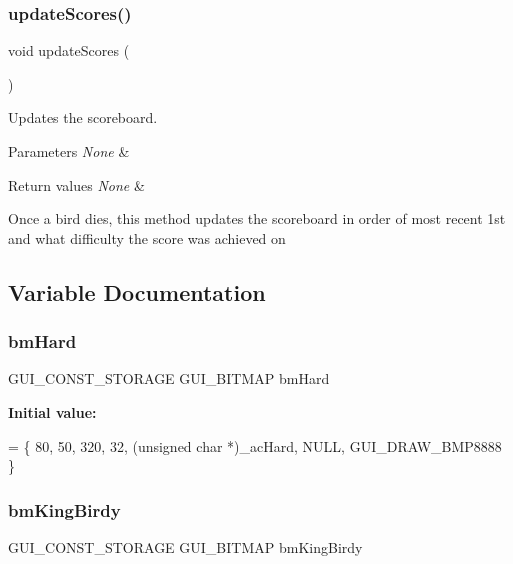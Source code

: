 \subsubsection{\texorpdfstring{update\+Scores()}{updateScores()}}
{\footnotesize\ttfamily void update\+Scores (\begin{DoxyParamCaption}{ }\end{DoxyParamCaption})}



Updates the scoreboard. 


\begin{DoxyParams}{Parameters}
{\em None} & \\
\hline
\end{DoxyParams}

\begin{DoxyRetVals}{Return values}
{\em None} & \\
\hline
\end{DoxyRetVals}
Once a bird dies, this method updates the scoreboard in order of most recent 1st and what difficulty the score was achieved on 

\subsection{Variable Documentation}
\mbox{\label{group___flappy___bird_ga7a953ee4b333e05b3030bb8122c960d2}} 
\subsubsection{\texorpdfstring{bm\+Hard}{bmHard}}
{\footnotesize\ttfamily G\+U\+I\+\_\+\+C\+O\+N\+S\+T\+\_\+\+S\+T\+O\+R\+A\+GE G\+U\+I\+\_\+\+B\+I\+T\+M\+AP bm\+Hard}

{\bfseries Initial value\+:}
\begin{DoxyCode}
= \{
  80, 
  50, 
  320, 
  32, 
  (\textcolor{keywordtype}{unsigned} \textcolor{keywordtype}{char} *)\_acHard,  
  NULL,  
  GUI\_DRAW\_BMP8888
\}
\end{DoxyCode}
\mbox{\label{group___flappy___bird_ga6eb6473b1aa5f3d15c7663658ac8d4d0}} 
\subsubsection{\texorpdfstring{bm\+King\+Birdy}{bmKingBirdy}}
{\footnotesize\ttfamily G\+U\+I\+\_\+\+C\+O\+N\+S\+T\+\_\+\+S\+T\+O\+R\+A\+GE G\+U\+I\+\_\+\+B\+I\+T\+M\+AP bm\+King\+Birdy}

